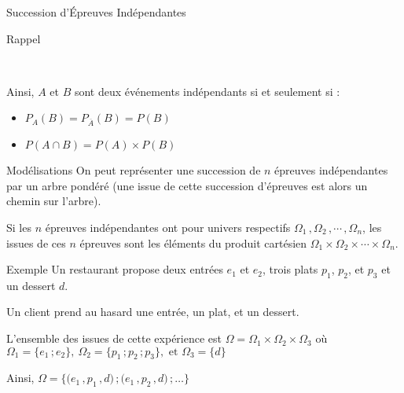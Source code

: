 \documentclass{cours}
\begin{document}
\begin{Gpartie}{Succession d'Épreuves Indépendantes}
\begin{Spartie}{Rappel}
\begin{center}
                \parbox{\linewidth}{} \\[2ex]
            \end{center}
            Ainsi, $A$ et $B$ sont deux événements indépendants si et seulement si :
            \begin{itemize}
                \item $P_A(B)=P_{\overline{A}}(B)=P(B)$
                \item $P(A\cap B)=P(A)\times P(B)$
            \end{itemize}
        \end{Spartie}
        \pagebreak
        \begin{Spartie}{Modélisations} 
            On peut représenter une succession de $n$ épreuves indépendantes par un arbre pondéré (une issue de cette succession d'épreuves est alors un chemin sur l'arbre).

            Si les $n$ épreuves indépendantes ont pour univers respectifs $\Omega_1\,,\Omega_2\,,\dotsb\,,\Omega_n$, les issues de ces $n$ épreuves sont les éléments du produit cartésien $\Omega_1\times\Omega_2\times\dotsb\times\Omega_n$.
        \end{Spartie}
        \begin{Spartie}{Exemple} 
            Un restaurant propose deux entrées $e_1$ et $e_2$, trois plats $p_1$, $p_2$, et $p_3$ et un dessert $d$.

            Un client prend au hasard une entrée, un plat, et un dessert.

            L'ensemble des issues de cette expérience est $\Omega=\Omega_1\times\Omega_2\times\Omega_3$ où $\Omega_1=\big\{e_1\,; e_2\big\},\ \Omega_2=\big\{p_1\,; p_2\,; p_3\big\},\text{ et }\Omega_3=\big\{d\big\}$

            Ainsi, $\Omega=\bigg\{\big(e_1\,, p_1\,, d\big)\,;\big(e_1\,, p_2\,, d\big)\,;\dotsc\bigg\}$


\end{Spartie}
\end{Gpartie}
\end{document}
